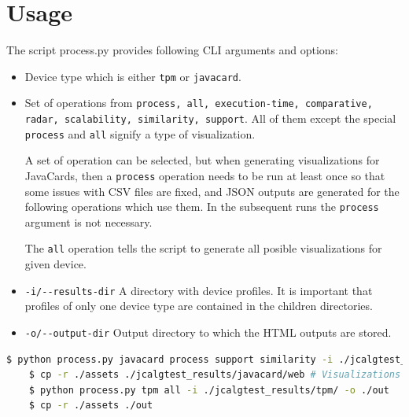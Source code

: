 \section{Usage}
The script process.py provides following CLI arguments and options:

\begin{itemize}
    \item Device type which is either \texttt{tpm} or \texttt{javacard}.
    \item Set of operations from \texttt{process, all, execution-time, comparative, radar, scalability, similarity, support}. All of them except the special \texttt{process} and \texttt{all} signify a type of visualization.
    
    A set of operation can be selected, but when generating visualizations for JavaCards, then a \texttt{process} operation needs to be run at least once so that some issues with CSV files are fixed, and JSON outputs are generated for the following operations which use them. In the subsequent runs the \texttt{process} argument is not necessary.
    
    The \texttt{all} operation tells the script to generate all posible visualizations for given device.
    \item \texttt{-i/-{}-results-dir} A directory with device profiles. It is important that profiles of only one device type are contained in the children directories.
    \item \texttt{-o/-{}-output-dir} Output directory to which the HTML outputs are stored. 
\end{itemize}

\begin{lstlisting}[language=bash]
    $ python process.py javacard process support similarity -i ./jcalgtest_results/javacard/ -o ./jcalgtest_results/javacard/web
    $ cp -r ./assets ./jcalgtest_results/javacard/web # Visualizations need assets folder
    $ python process.py tpm all -i ./jcalgtest_results/tpm/ -o ./out
    $ cp -r ./assets ./out
\end{lstlisting}

\renewcommand{\thechapter}{B}
